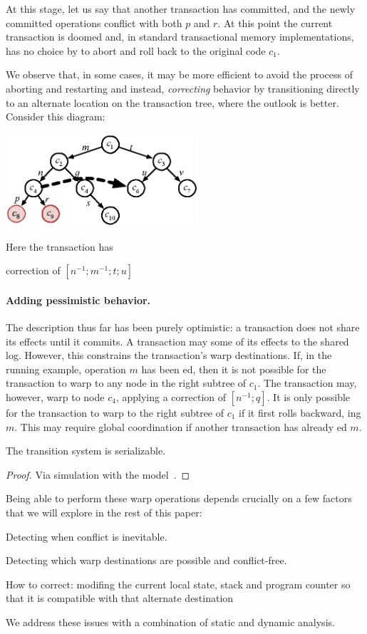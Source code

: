 At this stage, let us say that another transaction has committed, and
the newly committed operations conflict with both $p$ and $r$. At this
point the current transaction is doomed and, in standard transactional
memory implementations, has no choice by to abort and roll back to the
original code $c_1$. 

We observe that, in some cases, it may be more efficient to avoid the
process of aborting and restarting and instead, \emph{correcting}
behavior by transitioning directly to an alternate location on the
transaction tree, where the outlook is better. Consider this diagram:
\begin{center}
\includegraphics[width=2.8in]{stages1.eps}
\end{center}
Here the transaction has 

correction of $[n^{-1};m^{-1};t;u]$

\paragraph{Adding pessimistic behavior.}
%
The description thus far has been purely optimistic: a transaction
does not share its effects until it commits. A transaction may
\PUSH{} some of its effects to the shared log. However, this
constrains the transaction's warp destinations. 
%
If, in the running example, operation $m$ has been \PUSH{}ed, then it
is not possible for the transaction to warp to any node in the right
subtree of $c_1$. The transaction may, however, warp to node $c_4$,
applying a correction of $[n^{-1};q]$.
%
It is only possible for the transaction to warp to the right subtree
of $c_1$ if it first rolls backward, \UNPUSH{}ing $m$. This may
require global coordination if another transaction has already \PULL{}ed $m$.

\begin{theorem} The transition system is serializable.
\begin{proof}Via simulation with the \PMPY{} model~\cite{KP:PLDI15}.
\end{proof}
\end{theorem}

Being able to perform these warp operations depends crucially on a
few factors that we will explore in the rest of this paper:
\begin{itemize*}
\item Detecting when conflict is inevitable.
\item Detecting which warp destinations are possible and conflict-free.
\item How to correct: modifing the current local state, stack and
  program counter so that it
  is compatible with that alternate destination
\end{itemize*}
We address these issues with a combination of static and dynamic analysis.


